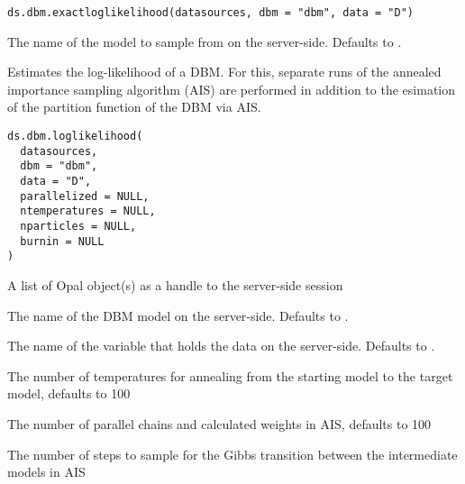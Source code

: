 %
\begin{Usage}
\begin{verbatim}
ds.dbm.exactloglikelihood(datasources, dbm = "dbm", data = "D")
\end{verbatim}
\end{Usage}
%
\begin{Arguments}
\begin{ldescription}
\item[\code{dbm}] The name of the model to sample from on the server-side. Defaults to .
\end{ldescription}
\end{Arguments}
%
\begin{Description}\relax
Estimates the log-likelihood of a DBM.
For this, separate runs of the annealed importance sampling algorithm (AIS)
are performed in addition to the esimation of the partition function of the DBM
via AIS.
\end{Description}
%
\begin{Usage}
\begin{verbatim}
ds.dbm.loglikelihood(
  datasources,
  dbm = "dbm",
  data = "D",
  parallelized = NULL,
  ntemperatures = NULL,
  nparticles = NULL,
  burnin = NULL
)
\end{verbatim}
\end{Usage}
%
\begin{Arguments}
\begin{ldescription}
\item[\code{datasources}] A list of Opal object(s) as a handle to the server-side session

\item[\code{dbm}] The name of the DBM model on the server-side. Defaults to .

\item[\code{data}] The name of the variable that holds the data on the server-side.
Defaults to .

\item[\code{ntemperatures}] The number of temperatures for annealing from the starting model
to the target model, defaults to 100

\item[\code{nparticles}] The number of parallel chains and calculated weights in AIS, defaults to 100

\item[\code{burnin}] The number of steps to sample for the Gibbs transition between the intermediate models in AIS
\end{ldescription}
\end{Arguments}
